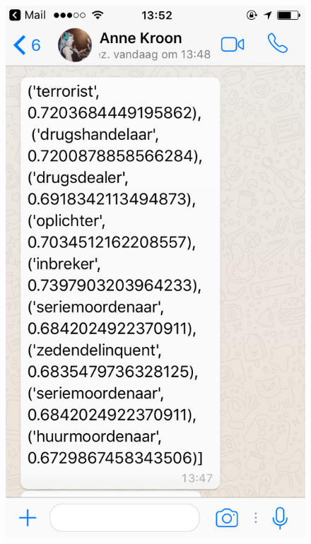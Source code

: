 \documentclass{beamer}
\begin{document}
\begin{frame}[plain]	

\begin{figure}
\centering
\includegraphics[width=.5\linewidth]{word2vec.png}
\end{figure}

\end{frame}
\end{document}
